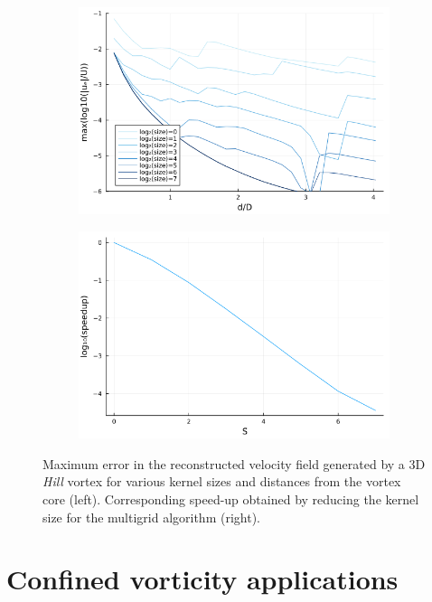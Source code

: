 \documentclass[preprint,12pt]{elsarticle}
\begin{document}
\begin{figure}
    \centering
    \begin{subfigure}{.5\textwidth}
        \centering
        \includegraphics[width=\textwidth]{tex//fig/Hill_error_dists.png}
    \end{subfigure}%
    \begin{subfigure}{.5\textwidth}
        \centering
        \includegraphics[width=\textwidth]{tex/fig/Hill_speedup_dists.png}
    \end{subfigure}
    \caption{Maximum error in the reconstructed velocity field generated by a 3D \emph{Hill} vortex for various kernel sizes and distances from the vortex core (left). Corresponding speed-up obtained by reducing the kernel size for the multigrid algorithm (right).}
    \label{fig:error_hill_3}
\end{figure}

\section{Confined vorticity applications}
\end{document}
